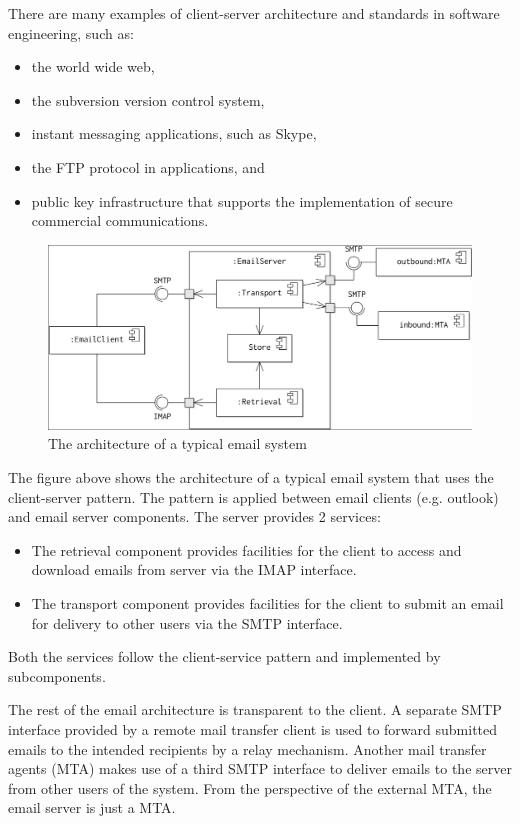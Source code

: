 \documentclass[a4paper, openany]{memoir}
\begin{document}
There are many examples of client-server architecture and standards in software engineering, such as:
\begin{itemize}
    \item the world wide web,
    \item the subversion version control system,
    \item instant messaging applications, such as Skype, 
    \item the FTP protocol in applications, and
    \item public key infrastructure that supports the implementation of secure commercial communications.
\end{itemize}
\begin{figure}[H]
    \centering
    \includegraphics[scale=0.28]{src/14.5 Email component.png}
    \caption{The architecture of a typical email system}
\end{figure}
\noindent The figure above shows the architecture of a typical email system that uses the client-server pattern. The pattern is applied between email clients (e.g. outlook) and email server components. The server provides 2 services:
\begin{itemize}
    \item The retrieval component provides facilities for the client to access and download emails from server via the IMAP interface.
    \item The transport component provides facilities for the client to submit an email for delivery to other users via the SMTP interface.
\end{itemize}
Both the services follow the client-service pattern and implemented by subcomponents. 

The rest of the email architecture is transparent to the client. A separate SMTP interface provided by a remote mail transfer client is used to forward submitted emails to the intended recipients by a relay mechanism. Another  mail transfer agents (MTA) makes use of a third SMTP interface to deliver emails to the server from other users of the system. From the perspective of the external MTA, the email server is just a MTA. 
\end{document}
